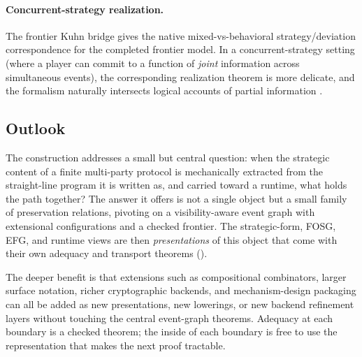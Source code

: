 \paragraph{Concurrent-strategy realization.}
The frontier Kuhn bridge gives the native mixed-vs-behavioral
strategy/deviation correspondence for the completed frontier model.  In
a concurrent-strategy setting (where a player can commit to a function of \emph{joint}
information across simultaneous events), the corresponding
realization theorem is more delicate, and the formalism naturally
intersects logical accounts of partial information
\citep{HintikkaSandu1989,MannSanduSevenster2011IFL}.

\subsection{Outlook}

The construction addresses a small but central question: when the
strategic content of a finite multi-party protocol is mechanically
extracted from the straight-line program it is written as, and carried
toward a runtime, what holds the path together?  The answer it offers is
not a single object but a small family of preservation relations, pivoting
on a visibility-aware event graph with extensional configurations and a
checked frontier.  The strategic-form, FOSG, EFG, and runtime views are
then \emph{presentations} of this object that come with their own
adequacy and transport theorems
().

The deeper benefit is that extensions such as compositional combinators,
larger surface notation, richer cryptographic backends, and
mechanism-design packaging can all be added as new presentations, new
lowerings, or new backend refinement layers without touching the central
event-graph theorems.  Adequacy at each boundary is a checked theorem;
the inside of each boundary is free to use the representation that makes
the next proof tractable.
